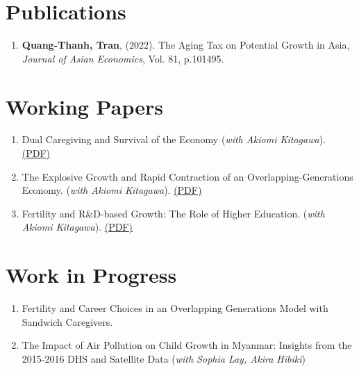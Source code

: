 \section{\sc Publications}
\begin{enumerate}
\item
  {\bf Quang-Thanh, Tran},
  (2022).
  {The Aging Tax on Potential Growth in Asia},
  {\it Journal of Asian Economics}, Vol. 81, p.101495.
\end{enumerate}

\section{\sc Working Papers}
\begin{enumerate}
  \item Dual Caregiving and Survival of the Economy (\textit{with Akiomi Kitagawa}). \href{https://www.dropbox.com/scl/fi/s00pcg0017vtyeb364hlc/main_dualcare-copy.pdf?rlkey=koecpcdaoeroijigjm5x4dtzv&st=6rnfdie5&dl=0}{(PDF)}
  \item The Explosive Growth and Rapid Contraction of an Overlapping-Generations Economy. (\textit{with Akiomi Kitagawa}). \href{https://www.dropbox.com/scl/fi/a7b1vnmypehibjmd2wim4/main_rapidcontraction.pdf?rlkey=t3aoep2iiy7shjmpq9cp6tuz3&st=b5jwqdqg&dl=0}{(PDF)}
  \item Fertility and R\&D-based Growth: The Role of Higher Education. (\textit{with Akiomi Kitagawa}). \href{https://www.dropbox.com/scl/fi/6bkvc2vxrbst1iwocxwdl/main_overedu.pdf?rlkey=v59fcybxfcd105y2ciassjttn&st=ym5ntxq0&dl=0}{(PDF)}
\end{enumerate}

\section{\sc Work in Progress}
\begin{enumerate}
  \item Fertility and Career Choices in an Overlapping Generations Model with Sandwich Caregivers.
  \item The Impact of Air Pollution on Child Growth in Myanmar: Insights from the 2015-2016 DHS and Satellite Data (\textit{with Sophia Lay, Akira Hibiki})
\end{enumerate}


